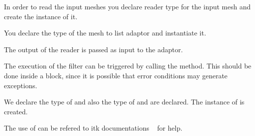 \documentclass{InsightArticle}
\begin{document}
\begin{center}

\end{center}

In order to read the input meshes you declare reader type for the input mesh
and create the instance of it.

\begin{center}

\end{center}


You declare the type of the mesh to list adaptor and instantiate it.

\begin{center}

\end{center}

The output of the reader is passed as input to the adaptor.

\begin{center}

\end{center}


The execution of the filter can be triggered by calling the  method.
This should be done inside a  block, since it is possible that error
conditions may generate exceptions.

\begin{center}

\end{center}

We declare the type of  and also the type
of  and  are declared. The instance of
  is created.

\begin{center}

\end{center}

The use of  can be refered to itk documentations
~\cite{ITKSoftwareGuide,ITKSoftwareGuideSecondEdition} for help.

\begin{center}

\end{center}
\end{document}
